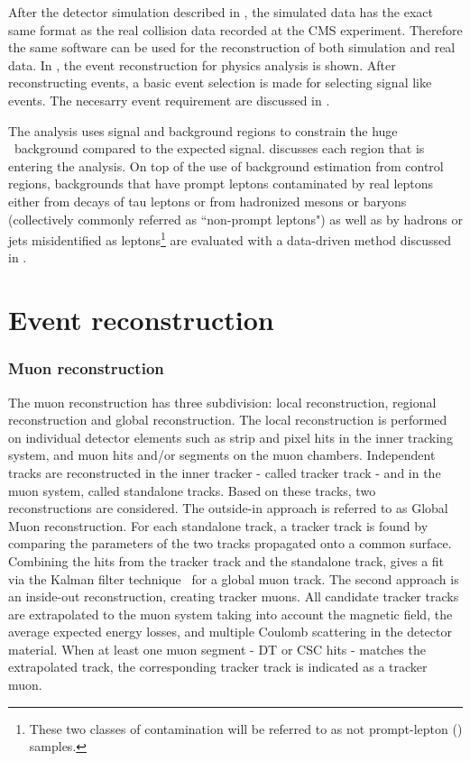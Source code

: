 After the detector simulation described in , the simulated data has the exact same format as the real collision data recorded at the CMS experiment. Therefore the same software can be used for the reconstruction of both simulation and real data. In , the event reconstruction for physics analysis is shown. After reconstructing events, a basic event selection is made for selecting signal like events. The necesarry event requirement are discussed in . 

The analysis uses signal and background regions to constrain the huge \SM\ background compared to the expected signal.  discusses each region that is entering the analysis. On top of the use of background estimation from control regions, backgrounds that have  prompt leptons  contaminated by real leptons either
from decays of tau leptons or from hadronized mesons or baryons
(collectively commonly referred as ``non-prompt leptons") as well as by
hadrons or jets misidentified as leptons\footnote{These two classes
of contamination will be referred to as not prompt-lepton (\NPL) samples.} are
evaluated with a data-driven method discussed in .

\section{Event reconstruction}
\label{sec:reco}

\subsubsection*{Muon reconstruction}
The muon reconstruction\cite{Chatrchyan:2012xi} has three subdivision: local reconstruction, regional reconstruction and global reconstruction. 
The local reconstruction is performed on individual detector elements such as strip and pixel hits in the inner tracking system, and muon hits and/or segments on the muon chambers. Independent tracks are reconstructed in the inner tracker - called tracker track -  and in the muon system, called standalone tracks.
Based on these tracks, two reconstructions are considered.
The outside-in approach is referred to as Global Muon reconstruction. 
For each standalone track, a tracker track is found by comparing the parameters of the two tracks propagated onto a common surface. Combining the hits from the tracker track and the standalone track, gives a fit via the Kalman filter technique~\cite{FRUHWIRTH1987444,Billoir:1989mh} for a global muon track. 
The second approach is an inside-out reconstruction, creating tracker muons. 
All candidate tracker tracks are extrapolated to the muon system taking into account the magnetic field, the average expected energy losses, and multiple Coulomb scattering in the detector material. When at least one muon segment - DT or CSC hits -  matches the extrapolated track, the corresponding tracker track is indicated as a tracker muon. 

